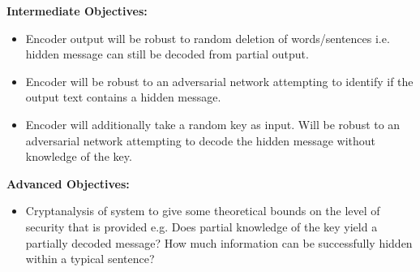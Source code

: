 \documentclass[10pt]{article}
\begin{document}
{\bf Intermediate Objectives:}
  \begin{itemize}  
    \item Encoder output will be robust to random deletion of words/sentences i.e. hidden message can still be decoded from partial output.
    \item Encoder will be robust to an adversarial network attempting to identify if the output text contains a hidden message.
    \item Encoder will additionally take a random key as input. Will be robust to an adversarial network attempting to decode the hidden message without knowledge of the key.
  \end{itemize}
{\bf Advanced Objectives:}
  \begin{itemize}  
    \item Cryptanalysis of system to give some theoretical bounds on the level of security that is provided e.g. Does partial knowledge of the key yield a partially decoded message? How much information can be successfully hidden within a typical sentence?
  \end{itemize}

\nocite{*}

\end{document}
